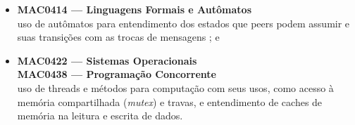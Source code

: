 \begin{itemize}
    \item \textbf{MAC0414 --- Linguagens Formais e Autômatos} \\
        uso de autômatos para entendimento dos estados que \glspl*{peer} podem assumir
        e suas transições com as trocas de mensagens \cite{conf:swarming}; e

    \item \textbf{MAC0422 --- Sistemas Operacionais} \\
        \textbf{MAC0438 --- Programação Concorrente} \\
        uso de \glspl{thread} e métodos para computação com seus usos, como acesso à
        memória compartilhada (\emph{mutex}) e travas, e entendimento de caches de
        memória na leitura e escrita de dados.
\end{itemize}

\afterpage{\clearpage}